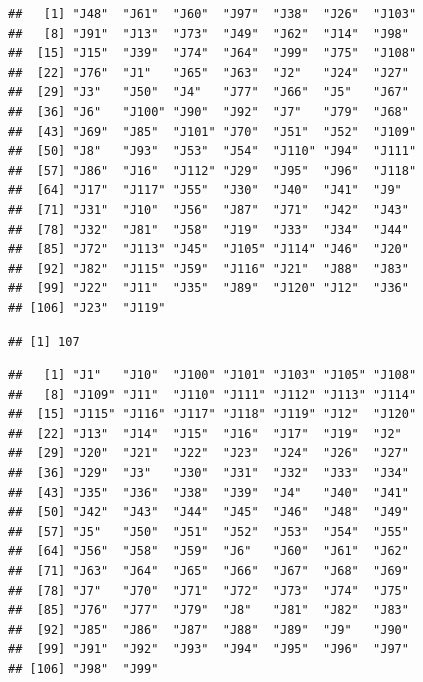 \documentclass[
]{krantz}
\makeatletter
\newenvironment{Shaded}{\begin{snugshade}}{\end{snugshade}}
\newcommand{\FunctionTok}[1]{\textcolor[rgb]{0,0,0}{#1}}
\newcommand{\NormalTok}[1]{#1}
\newcommand{\SpecialCharTok}[1]{\textcolor[rgb]{0,0,0}{#1}}
\newenvironment{kframe}{%
\medskip{}
\setlength{\fboxsep}{.8em}
 \def\at@end@of@kframe{}%
 \ifinner\ifhmode%
  \def\at@end@of@kframe{\end{minipage}}%
  \begin{minipage}{\columnwidth}%
 \fi\fi%
 \def\FrameCommand##1{\hskip\@totalleftmargin \hskip-\fboxsep
 \colorbox{shadecolor}{##1}\hskip-\fboxsep
     \hskip-\linewidth \hskip-\@totalleftmargin \hskip\columnwidth}%
 \MakeFramed {\advance\hsize-\width
   \@totalleftmargin\z@ \linewidth\hsize
   \@setminipage}}%
 {\par\unskip\endMakeFramed%
 \at@end@of@kframe}
\renewenvironment{Shaded}{\begin{kframe}}{\end{kframe}}
\makeatother
\begin{document}
\begin{verbatim}
##   [1] "J48"  "J61"  "J60"  "J97"  "J38"  "J26"  "J103"
##   [8] "J91"  "J13"  "J73"  "J49"  "J62"  "J14"  "J98" 
##  [15] "J15"  "J39"  "J74"  "J64"  "J99"  "J75"  "J108"
##  [22] "J76"  "J1"   "J65"  "J63"  "J2"   "J24"  "J27" 
##  [29] "J3"   "J50"  "J4"   "J77"  "J66"  "J5"   "J67" 
##  [36] "J6"   "J100" "J90"  "J92"  "J7"   "J79"  "J68" 
##  [43] "J69"  "J85"  "J101" "J70"  "J51"  "J52"  "J109"
##  [50] "J8"   "J93"  "J53"  "J54"  "J110" "J94"  "J111"
##  [57] "J86"  "J16"  "J112" "J29"  "J95"  "J96"  "J118"
##  [64] "J17"  "J117" "J55"  "J30"  "J40"  "J41"  "J9"  
##  [71] "J31"  "J10"  "J56"  "J87"  "J71"  "J42"  "J43" 
##  [78] "J32"  "J81"  "J58"  "J19"  "J33"  "J34"  "J44" 
##  [85] "J72"  "J113" "J45"  "J105" "J114" "J46"  "J20" 
##  [92] "J82"  "J115" "J59"  "J116" "J21"  "J88"  "J83" 
##  [99] "J22"  "J11"  "J35"  "J89"  "J120" "J12"  "J36" 
## [106] "J23"  "J119"
\end{verbatim}

\begin{Shaded}
\end{Shaded}

\begin{verbatim}
## [1] 107
\end{verbatim}

\begin{Shaded}
\end{Shaded}

\begin{verbatim}
##   [1] "J1"   "J10"  "J100" "J101" "J103" "J105" "J108"
##   [8] "J109" "J11"  "J110" "J111" "J112" "J113" "J114"
##  [15] "J115" "J116" "J117" "J118" "J119" "J12"  "J120"
##  [22] "J13"  "J14"  "J15"  "J16"  "J17"  "J19"  "J2"  
##  [29] "J20"  "J21"  "J22"  "J23"  "J24"  "J26"  "J27" 
##  [36] "J29"  "J3"   "J30"  "J31"  "J32"  "J33"  "J34" 
##  [43] "J35"  "J36"  "J38"  "J39"  "J4"   "J40"  "J41" 
##  [50] "J42"  "J43"  "J44"  "J45"  "J46"  "J48"  "J49" 
##  [57] "J5"   "J50"  "J51"  "J52"  "J53"  "J54"  "J55" 
##  [64] "J56"  "J58"  "J59"  "J6"   "J60"  "J61"  "J62" 
##  [71] "J63"  "J64"  "J65"  "J66"  "J67"  "J68"  "J69" 
##  [78] "J7"   "J70"  "J71"  "J72"  "J73"  "J74"  "J75" 
##  [85] "J76"  "J77"  "J79"  "J8"   "J81"  "J82"  "J83" 
##  [92] "J85"  "J86"  "J87"  "J88"  "J89"  "J9"   "J90" 
##  [99] "J91"  "J92"  "J93"  "J94"  "J95"  "J96"  "J97" 
## [106] "J98"  "J99"
\end{verbatim}
\end{document}

